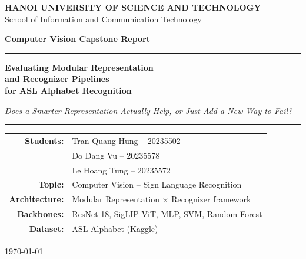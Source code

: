 \documentclass[11pt,a4paper]{article}
\begin{document}

\begin{titlepage}
  \thispagestyle{empty}

  \noindent
  \colorbox{hustblue}{%
    \begin{minipage}{\textwidth}
      \vspace{8pt}
      \centering
      {\color{white}\large\bfseries
        HANOI UNIVERSITY OF SCIENCE AND TECHNOLOGY}\\[3pt]
      {\color{white!80!hustblue}\normalsize
        School of Information and Communication Technology}
      \vspace{8pt}
    \end{minipage}}

  \vspace{2.5cm}
  \begin{center}
    {\Huge\bfseries Computer Vision Capstone Report\par}
    \vspace{0.9cm}
    \textcolor{hustblue}{\rule{0.6\textwidth}{1.2pt}}
    \vspace{0.7cm}

    {\LARGE\bfseries
      Evaluating Modular Representation\\[4pt]
      and Recognizer Pipelines\\[4pt]
      for ASL Alphabet Recognition\par}
    \vspace{0.5cm}
    {\large\itshape
      Does a Smarter Representation Actually Help, or Just Add a New Way to Fail?\par}

    \vspace{1.2cm}
    \textcolor{hustblue}{\rule{0.6\textwidth}{0.6pt}}
    \vspace{1.0cm}

    \begin{tabular}{rl}
      \textbf{Students:}      & Tran Quang Hung -- 20235502 \\[2pt]
                               & Do Dang Vu -- 20235578 \\[2pt]
                               & Le Hoang Tung -- 20235572 \\[6pt]
      \textbf{Topic:}         & Computer Vision -- Sign Language Recognition \\[4pt]
      \textbf{Architecture:}  & Modular Representation $\times$ Recognizer framework \\[4pt]
      \textbf{Backbones:}     & ResNet-18, SigLIP ViT, MLP, SVM, Random Forest \\[4pt]
      \textbf{Dataset:}       & ASL Alphabet (Kaggle) \\
    \end{tabular}

    \vfill
    {\large\today}
  \end{center}
\end{titlepage}
\end{document}
